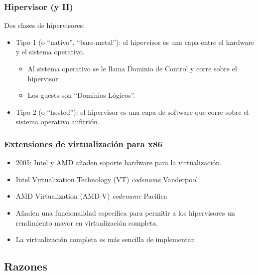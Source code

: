 \documentclass{beamer}
\begin{document}
\begin{frame}
\frametitle{Hipervisor (y II)}

Dos clases de hipervisores:

\begin{itemize}
\item \alert{Tipo 1} (o ``nativo'', ``bare-metal''): el hipervisor es una capa entre el hardware y el sistema operativo. 
\begin{itemize}
\item Al sistema operativo se le llama Dominio de Control  y corre sobre el hipervisor.
\item Los guests son ``Dominios Lógicos''.
\end{itemize}

\item \alert{Tipo 2} (o ``hosted''): el hipervisor es una capa de software que corre sobre el sistema operativo anfitrión.
\end{itemize}

\end{frame}



\begin{frame}
\frametitle{Extensiones de virtualización para x86}

\begin{itemize}
\item 2005: Intel y AMD añaden soporte hardware para la virtualización.
\item Intel Virtualization Technology (VT) \textit{codename} Vanderpool
\item AMD Virtualization (AMD-V) \textit{codename} Pacifica
\item Añaden una funcionalidad específica para permitir a los hipervisores un rendimiento mayor en virtualización completa.
\item La virtualización completa es más sencilla de implementar.
\end{itemize}

\end{frame}




\subsection{Razones}
\end{document}
